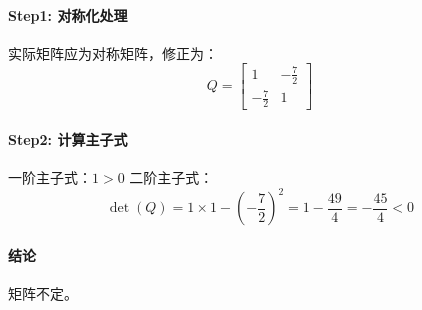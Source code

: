 \paragraph{Step1: 对称化处理}  
实际矩阵应为对称矩阵，修正为：
\[
Q = \begin{bmatrix} 1 & -\frac{7}{2} \\ -\frac{7}{2} & 1 \end{bmatrix}
\]

\paragraph{Step2: 计算主子式}  
一阶主子式：\(1 > 0\)  
二阶主子式：
\[
\det(Q) = 1 \times 1 - \left(-\frac{7}{2}\right)^2 = 1 - \frac{49}{4} = -\frac{45}{4} < 0
\]

\paragraph{结论}  
矩阵不定。